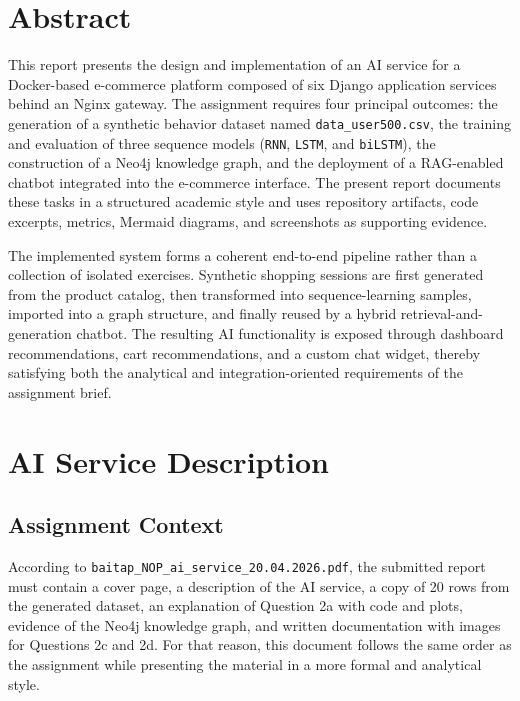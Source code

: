 \documentclass[12pt,a4paper]{article}
\begin{document}
\tableofcontents
\clearpage
{}

\section{Abstract}
This report presents the design and implementation of an AI service for a Docker-based e-commerce platform composed of six Django application services behind an Nginx gateway. The assignment requires four principal outcomes: the generation of a synthetic behavior dataset named \texttt{data\_user500.csv}, the training and evaluation of three sequence models (\texttt{RNN}, \texttt{LSTM}, and \texttt{biLSTM}), the construction of a Neo4j knowledge graph, and the deployment of a RAG-enabled chatbot integrated into the e-commerce interface. The present report documents these tasks in a structured academic style and uses repository artifacts, code excerpts, metrics, Mermaid diagrams, and screenshots as supporting evidence.

The implemented system forms a coherent end-to-end pipeline rather than a collection of isolated exercises. Synthetic shopping sessions are first generated from the product catalog, then transformed into sequence-learning samples, imported into a graph structure, and finally reused by a hybrid retrieval-and-generation chatbot. The resulting AI functionality is exposed through dashboard recommendations, cart recommendations, and a custom chat widget, thereby satisfying both the analytical and integration-oriented requirements of the assignment brief.

\section{AI Service Description}

\subsection{Assignment Context}
According to \texttt{baitap\_NOP\_ai\_service\_20.04.2026.pdf}, the submitted report must contain a cover page, a description of the AI service, a copy of 20 rows from the generated dataset, an explanation of Question 2a with code and plots, evidence of the Neo4j knowledge graph, and written documentation with images for Questions 2c and 2d. For that reason, this document follows the same order as the assignment while presenting the material in a more formal and analytical style.
\end{document}
